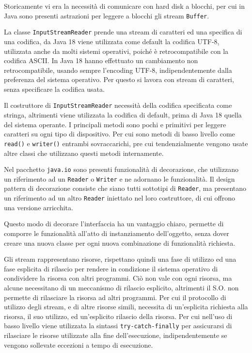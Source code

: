 \documentclass{article}
\numberwithin{equation}{subsection}
\begin{document}

Storicamente vi era la necessità di comunicare con hard disk a blocchi, per cui in Java sono presenti astrazioni per leggere a blocchi gli stream \verb|Buffer|. 

La classe \verb|InputStreamReader| prende una stream di caratteri ed una specifica di una codifica, da Java 18 viene utilizzata come default la codifica UTF-8, utilizzata 
anche da molti sistemi operativi, poiché è retrocompatibile con la codifica ASCII. In Java 18 hanno effettuato un cambiamento non retrocompatibile, usando sempre l'encoding 
UTF-8, indipendentemente dalla preferenza del sistema operativo. Per questo si lavora con stream di caratteri, senza specificare la codifica usata. 

Il costruttore di \verb|InputStreamReader| necessità della codifica specificata come stringa, altrimenti viene utilizzata la codifica di default, prima di Java 18 quella del sistema 
operante. 
I principali metodi sono pochi e primitivi per leggere caratteri su ogni tipo di dispositivo. Per cui sono metodi di basso livello come \verb|read()| e \verb|writer()| 
entrambi sovraccarichi, pre cui tendenzialmente vengono usate altre classi che utilizzano questi metodi internamente. 

Nel pacchetto \verb|java.io| sono presenti funzionalità di decorazione, che utilizzano un riferimento ad un \verb|Reader| o \verb|Writer| e ne adornano le funzionalità. 
Il design pattern di decorazione consiste che siano tutti sottotipi di \verb|Reader|, ma presentano un riferimento ad un altro \verb|Reader| iniettato nel loro costruttore, di cui 
offrono una versione arricchita. 

Questo modo di decorare l'interfaccia ha un vantaggio chiaro, permette di comporre le funzionalità all'atto di instanziamento dell'oggetto, senza dover creare una nuova classe 
per ogni nuova combinazione di funzionalità richiesta. 

Gli stream rappresentano risorse, rispettano quindi una fase di utilizzo ed una fase esplicita di rilascio per rendere in condizione il sistema operativo di condividere la 
risorsa con altri programmi. 
Ciò non vale con ogni risorsa, ma alcune necessitano di un meccanismo di rilascio esplicito, altrimenti il S.O. non permette di rilasciare la risorsa ad altri programmi. 
Per cui il protocollo di utilizzo degli stream, e di altre risorse simili, necessita di un'esplicita richiesta alla risorsa, il suo utilizzo, ed un'esplicito rilascio 
della risorsa. 
Per cui nell'uso di basso livello viene utilizzata la sintassi \verb|try-catch-finally| per assicurarsi di rilasciare le risorse utilizzate alla fine dell'esecuzione, 
indipendentemente se vengono sollevate eccezioni a tempo di esecuzione. 
\end{document}
